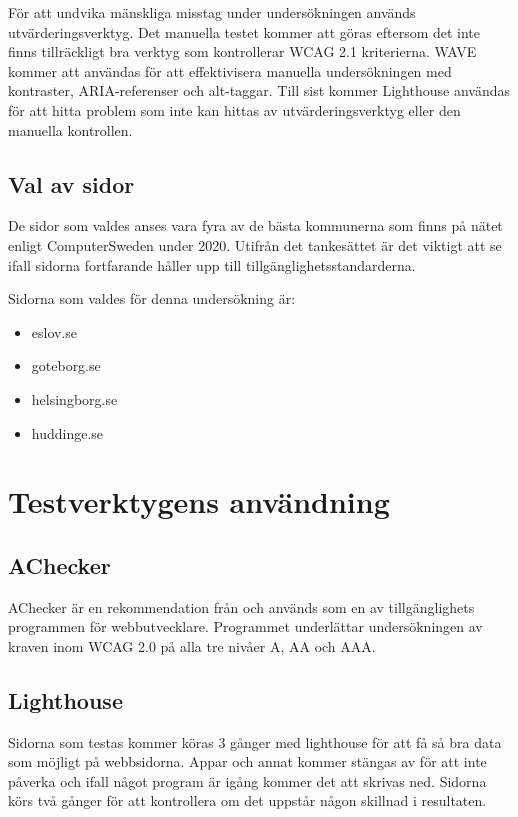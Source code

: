 \documentclass[11p]{article}
\begin{document}
    För att undvika mänskliga misstag under undersökningen används utvärderingsverktyg.
    Det manuella testet kommer att göras eftersom det inte finns tillräckligt bra verktyg som kontrollerar WCAG 2.1 kriterierna.
    WAVE kommer att användas för att effektivisera manuella undersökningen med kontraster, ARIA-referenser och alt-taggar.
    Till sist kommer Lighthouse användas för att hitta problem som inte kan hittas av utvärderingsverktyg eller den manuella kontrollen.

    \subsection{Val av sidor}
    De sidor som valdes anses vara fyra av de bästa kommunerna som finns på nätet enligt ComputerSweden under 2020.
    Utifrån det tankesättet är det viktigt att se ifall sidorna fortfarande håller upp till tillgänglighetsstandarderna.

    Sidorna som valdes för denna undersökning är:

    \begin{itemize}
        \item eslov.se
        \item goteborg.se
        \item helsingborg.se
        \item huddinge.se
    \end{itemize}

    \section{Testverktygens användning}

    \subsection{AChecker}
    AChecker är en rekommendation från \textcite{AChecker} och används som en av tillgänglighets programmen för webbutvecklare.
    Programmet underlättar undersökningen av kraven inom WCAG 2.0 på alla tre nivåer A, AA och AAA.

    \subsection{Lighthouse}
    Sidorna som testas kommer köras 3 gånger med lighthouse för att få så bra data som möjligt på webbsidorna.
    Appar och annat kommer stängas av för att inte påverka och ifall något program är igång kommer det att skrivas ned.
    Sidorna körs två gånger för att kontrollera om det uppstår någon skillnad i resultaten.
\end{document}
